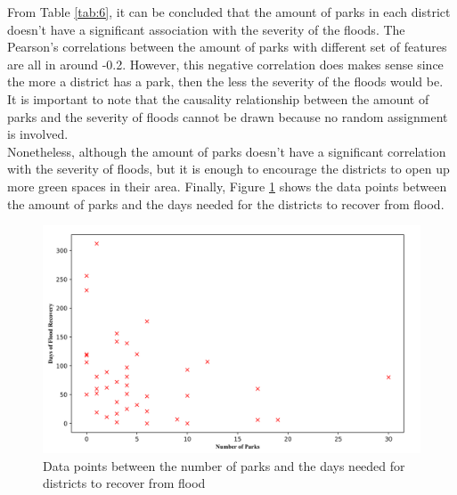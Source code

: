 \noindent
From Table \ref{tab:6}, it can be concluded that the amount of parks in each district doesn't have a significant association with the severity of the floods. The Pearson's correlations between the amount of parks with different set of features are all in around -0.2. However, this negative correlation does makes sense since the more a district has a park, then the less the severity of the floods would be. It is important to note that the causality relationship between the amount of parks and the severity of floods cannot be drawn because no random assignment is involved.\\

\noindent
Nonetheless, although the amount of parks doesn't have a significant correlation with the severity of floods, but it is enough to encourage the districts to open up more green spaces in their area. Finally, Figure \ref{fig=parks.png} shows the data points between the amount of parks and the days needed for the districts to recover from flood.\\

\begin{figure}
\begin{center}
\graphicspath{ {./Pict/} }
\includegraphics[scale=0.15]{parks.png}
\caption{Data points between the number of parks and the days needed for districts to recover from flood}\label{fig=parks.png}
\end{center}
\end{figure}
